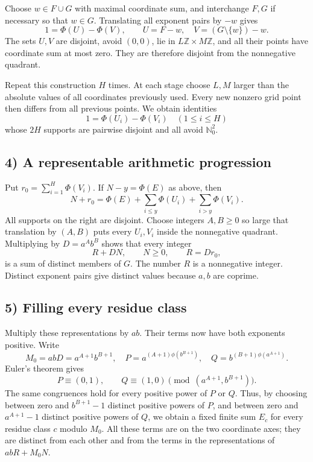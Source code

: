 Choose $w\in F\cup G$ with maximal coordinate sum, and interchange
$F,G$ if necessary so that $w\in G$. Translating all exponent
pairs by $-w$ gives
\[
 1=\Phi(U)-\Phi(V),\qquad
 U=F-w,\quad V=(G\setminus\{w\})-w.
\]
The sets $U,V$ are disjoint, avoid $(0,0)$, lie in
$L\mathbb Z\times M\mathbb Z$, and all their points have
coordinate sum at most zero. They are therefore disjoint
from the nonnegative quadrant.

Repeat this construction $H$ times. At each stage choose $L,M$
larger than the absolute values of all coordinates previously
used. Every new nonzero grid point then differs from all
previous points. We obtain identities
\[
 1=\Phi(U_i)-\Phi(V_i)\quad(1\leq i\leq H)
\]
whose $2H$ supports are pairwise disjoint and all avoid
$\mathbb N_0^2$.

\subsection{4) A representable arithmetic progression}
Put $r_0=\sum_{i=1}^H\Phi(V_i)$. If $N-y=\Phi(E)$ as above,
then
\[
 N+r_0=\Phi(E)+\sum_{i\leq y}\Phi(U_i)
                       +\sum_{i>y}\Phi(V_i).
\]
All supports on the right are disjoint. Choose integers $A,B\geq0$
so large that translation by $(A,B)$ puts every $U_i,V_i$
inside the nonnegative quadrant. Multiplying by $D=a^A b^B$
shows that every integer
\[
 R+DN,\qquad N\geq0,\qquad R=Dr_0,
\]
is a sum of distinct members of $G$. The number $R$ is a
nonnegative integer. Distinct exponent pairs give distinct
values because $a,b$ are coprime.

\subsection{5) Filling every residue class}
Multiply these representations by $ab$. Their terms now have
both exponents positive. Write
\[
 M_0=abD=a^{A+1}b^{B+1},\quad
 P=a^{(A+1)\phi(b^{B+1})},\quad
 Q=b^{(B+1)\phi(a^{A+1})}.
\]
Euler's theorem gives
\[
 P\equiv(0,1),\qquad Q\equiv(1,0)
       \pmod{(a^{A+1},b^{B+1})}.
\]
The same congruences hold for every positive power of $P$ or $Q$.
Thus, by choosing between zero and $b^{B+1}-1$ distinct positive
powers of $P$, and between zero and $a^{A+1}-1$ distinct positive
powers of $Q$, we obtain a fixed finite sum $E_c$ for every
residue class $c$ modulo $M_0$.
All these terms are on the two coordinate axes; they are
distinct from each other and from the terms in the representations
of $abR+M_0N$.

